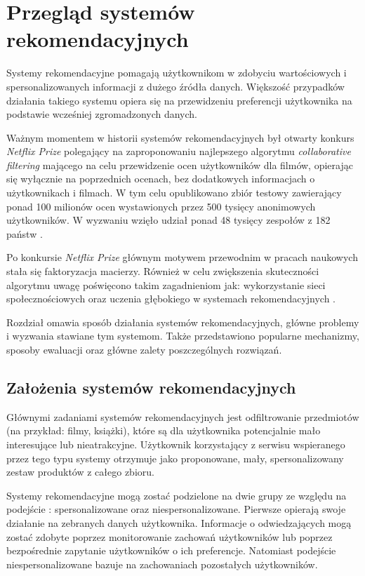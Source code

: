 \chapter{Przegląd systemów rekomendacyjnych}

Systemy rekomendacyjne pomagają użytkownikom w zdobyciu wartościowych i spersonalizowanych informacji z dużego źródła danych. Większość przypadków działania takiego systemu opiera się na przewidzeniu preferencji użytkownika na podstawie wcześniej zgromadzonych danych.

Ważnym momentem w historii systemów rekomendacyjnych był otwarty konkurs \textit{Netflix Prize} polegający na zaproponowaniu najlepszego algorytmu \textit{collaborative filtering} mającego na celu przewidzenie ocen użytkowników dla filmów, opierając się wyłącznie na poprzednich ocenach, bez dodatkowych informacjach o użytkownikach i filmach. W tym celu opublikowano zbiór testowy zawierający ponad 100 milionów ocen wystawionych przez 500 tysięcy anonimowych użytkowników. W wyzwaniu wzięło udział ponad 48 tysięcy zespołów z 182 państw \cite{netflix_prize}.

Po konkursie \textit{Netflix Prize} głównym motywem przewodnim w pracach naukowych stała się faktoryzacja macierzy. Również w celu zwiększenia skuteczności algorytmu uwagę poświęcono takim zagadnieniom jak: wykorzystanie sieci społecznościowych oraz uczenia głębokiego w systemach rekomendacyjnych \cite{recent_developments}.

Rozdział omawia sposób działania systemów rekomendacyjnych, główne problemy i wyzwania stawiane tym systemom. Także przedstawiono popularne mechanizmy, sposoby ewaluacji oraz główne zalety poszczególnych rozwiązań.

\section{Założenia systemów rekomendacyjnych}

Głównymi zadaniami systemów rekomendacyjnych jest odfiltrowanie przedmiotów (na przykład: filmy, książki), które są dla użytkownika potencjalnie mało interesujące lub nieatrakcyjne. Użytkownik korzystający z serwisu wspieranego przez tego typu systemy otrzymuje jako proponowane, mały, spersonalizowany zestaw produktów z całego zbioru.

Systemy rekomendacyjne mogą zostać podzielone na dwie grupy ze względu na podejście \cite{recent_developments}: spersonalizowane oraz niespersonalizowane. Pierwsze opierają swoje działanie na zebranych danych użytkownika. Informacje o odwiedzających mogą zostać zdobyte poprzez monitorowanie zachowań użytkowników lub poprzez bezpośrednie zapytanie użytkowników o ich preferencje. Natomiast podejście niespersonalizowane bazuje na zachowaniach pozostałych użytkowników.

